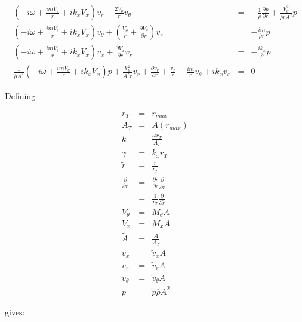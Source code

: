 \documentclass[12pt]{article}
\begin{document}
\begin{eqnarray}
\left(
-i \omega
+ \frac{i m V_{\theta}}{r}
+i k_x V_x 
\right) v_r
-\frac{2 V_{\theta}}{r} v_{\theta}
&=&
-\frac{1}{\overline{\rho}} \frac{\partial p}{\partial r}
+\frac{V_{\theta}^2}{\overline{\rho} r A^2} p
\nonumber
\\
\left(
-i \omega
+ \frac{i m V_{\theta}}{r}
+i k_x V_x 
\right) v_{\theta}
+
\left(
\frac{V_{\theta}}{r}
+\frac{\partial V_{\theta}}{\partial r}
\right) v_r
&=&
-\frac{i m}{\overline{\rho} r} p
\nonumber
\\
\left(
-i \omega
+ \frac{i m V_{\theta}}{r}
+i k_x V_x 
\right) v_x
+\frac{\partial V_x}{\partial r} v_r
&=&
-\frac{i k_x}{\overline{\rho}} p
\nonumber
\\
\frac{1}{ \overline{\rho} A^2}
\left(
-i \omega
+ \frac{i m V_{\theta}}{r} 
+ i k_x V_x 
\right) p
+\frac{V_{\theta}^2}{A^2 r}
v_r
+ 
\frac{\partial v_r}{\partial r}
+ 
\frac{v_r}{r} 
+\frac{i m }{r} v_{\theta} 
+ i k_x v_x
&=&
0
\nonumber
\end{eqnarray}

Defining

\begin{eqnarray}
r_T &=& r_{max}
\nonumber
\\
A_T &=& A \left(r_{max} \right)
\nonumber
\\
k &=& \frac{\omega r_T}{A_T}
\nonumber
\\
\overline{\gamma}
&=& k_x r_T
\nonumber
\\
\widetilde{r} &=& \frac{r}{r_T}
\nonumber
\\
\frac{\partial}{\partial r} 
&=& 
\frac{\partial \widetilde{r} }{\partial r} 
\frac{\partial}{\partial \widetilde{r}} 
\nonumber
\\
&=& 
\frac{1}{r_T}
\frac{\partial}{\partial \widetilde{r}} 
\nonumber
\\
V_{\theta} &=& M_{\theta} A
\nonumber
\\
V_{x} &=& M_{x} A
\nonumber
\\
\widetilde{A} &=& \frac{A}{A_T}
\nonumber
\\
v_x &=& \widetilde{v}_x A
\nonumber
\\
v_r &=& \widetilde{v}_r A
\nonumber
\\
v_{\theta} &=& \widetilde{v}_{\theta} A
\nonumber
\\
p &=& \widetilde{p} \overline{\rho} A^2
\nonumber
\end{eqnarray}

gives:
\end{document}
